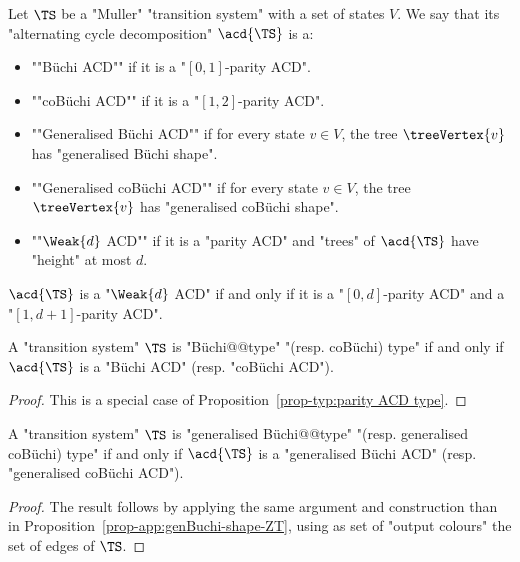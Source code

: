 \documentclass{theoretics}
\begin{document}
\begin{definition}
	Let $\TS$ be a "Muller" "transition system" with a set of states $V$. We say that its "alternating cycle decomposition" $\acd{\TS}$ is a:
	\begin{itemize}
		\item \AP ""B\"uchi ACD"" if it is a "$[0,1]$-parity ACD".
		\item \AP ""coB\"uchi ACD"" if it is a "$[1,2]$-parity ACD".
		\item  \AP""Generalised B\"uchi ACD"" if for every state $v\in V$, the tree $\treeVertex{v}$ has "generalised B\"uchi shape".
		\item  \AP""Generalised coB\"uchi ACD"" if for every state $v\in V$, the tree $\treeVertex{v}$ has "generalised coB\"uchi shape".
		\item \AP ""$\Weak{d}$ ACD"" if it is a "parity ACD" and "trees" of $\acd{\TS}$ have "height" at most $d$.
	\end{itemize}
\end{definition}

\begin{remark}\label{rmk-typ:shape-weak-ACD}
	 $\acd{\TS}$ is a "$\Weak{d}$ ACD" if and only if it is a "$[0,d]$-parity ACD" and a "$[1,d+1]$-parity ACD".
\end{remark}

\begin{proposition}
	A "transition system" $\TS$ is "B\"uchi@@type" "(resp. coB\"uchi) type" if and only if $\acd{\TS}$ is a "B\"uchi ACD" (resp. "coB\"uchi ACD").
\end{proposition}
\begin{proof}
	This is a special case of Proposition~\ref{prop-typ:parity ACD type}.
\end{proof}


\begin{proposition}\label{prop-app:genBuchi-ACD type}
	A "transition system" $\TS$ is "generalised B\"uchi@@type" "(resp. generalised coB\"uchi) type" if and only if $\acd{\TS}$ is a "generalised B\"uchi ACD" (resp. "generalised coB\"uchi ACD").
\end{proposition}
\begin{proof}
	The result follows by applying the same argument and construction than in Proposition~\ref{prop-app:genBuchi-shape-ZT}, using as set of "output colours" the set of edges of $\TS$.
\end{proof}
\end{document}
